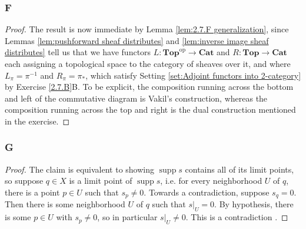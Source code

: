 \documentclass{article}
\DeclareMathOperator{\supp}{supp}
\DeclareMathOperator{\op}{op}
\newcommand{\Top}{\mathbf{Top}} %
\newcommand{\Cat}{\mathbf{Cat}} %
\begin{document}
\subsubsection{F}\label{2.7.F}
\begin{proof}
    The result is now immediate by Lemma \ref{lem:2.7.F generalization}, since Lemmas \ref{lem:pushforward sheaf distributes} and \ref{lem:inverse image sheaf distributes} tell us that we have functors $L:\Top^{\op} \to \Cat$ and $R:\Top \to \Cat$ each assigning a topological space to the category of sheaves over it, and where $L_\pi = \pi^{-1}$ and $R_\pi = \pi_*$, which satisfy Setting \ref{set:Adjoint functors into 2-category} by Exercise \ref{2.7.B}B. To be explicit, the composition running across the bottom and left of the commutative diagram is Vakil's construction, whereas the composition running across the top and right is the dual construction mentioned in the exercise.
\end{proof}
\subsubsection{G}\label{2.7.G}
\begin{proof}
    The claim is equivalent to showing $\supp s$ contains all of its limit points, so suppose $q\in X$ is a limit point of $\supp s$, i.e. for every neighborhood $U$ of $q$, there is a point $p\in U$ such that $s_p\ne 0$. Towards a contradiction, suppose $s_q =0$. Then there is some neighborhood $U$ of $q$ such that $s\vert_U = 0$. By hypothesis, there is some $p\in U$ with $s_p\ne 0$, so in particular $s\vert_U \ne 0$. This is a contradiction .
\end{proof}
\end{document}
